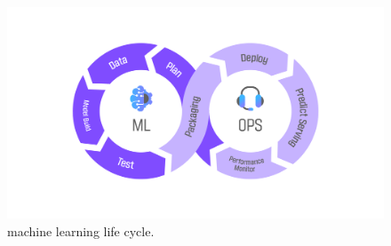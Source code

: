 \begin{figure}[htbp]
    \centering
    \includegraphics[width=0.78\linewidth]{figures/machine-learning-life-cycle.png}
    \caption{machine learning life cycle.}
    \label{fig:machine_learning_lifecycle}
\end{figure}